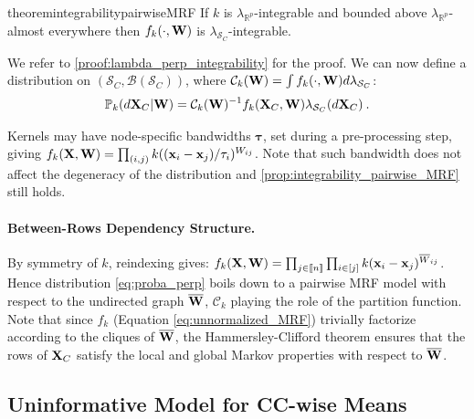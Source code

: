 \begin{restatable}{theorem}{integrabilitypairwiseMRF}
\label{prop:integrability_pairwise_MRF}
If $k$ is $\lambda_{\mathbb{R}^p}$-integrable and bounded above $\lambda_{\mathbb{R}^p}$-almost everywhere then $f_{k}(\cdot, \mathbf{W})$ is $\lambda_{\mathcal{S}_{C}}$-integrable.
\end{restatable}

We refer to \cref{proof:lambda_perp_integrability} for the proof.
We can now define a distribution on $(\mathcal{S}_{C}, \mathcal{B}(\mathcal{S}_{C}))$, where $\mathcal{C}_{k}(\mathbf{W}) = \int f_{k}(\cdot, \mathbf{W}) d\lambda_{\mathcal{S}_{C}}$:
\begin{align}\label{eq:proba_perp}
\mathbb{P}_{k}(d\mathbf{X}_{C} | \mathbf{W}) = \mathcal{C}_{k}(\mathbf{W})^{-1} f_{k}(\mathbf{X}_{C}, \mathbf{W}) \lambda_{\mathcal{S}_{C}}(d\mathbf{X}_{C}) \: .
\end{align}

\begin{remark}
Kernels may have node-specific bandwidths $\bm{\tau}$, set during a pre-processing step, giving $f_{k}(\mathbf{X},\mathbf{W}) = \prod_{(i,j)} k((\mathbf{x}_{i} - \mathbf{x}_{j})/\tau_{i})^{W_{ij}}$. Note that such bandwidth does not affect the degeneracy of the distribution and \cref{prop:integrability_pairwise_MRF} still holds.
\end{remark}


\paragraph{Between-Rows Dependency Structure.} By symmetry of $k$, reindexing gives: $f_{k}(\mathbf{X}, \mathbf{W}) = \prod_{j \in {[\![n]\!]}} \prod_{i \in [j]} k(\mathbf{x}_{i} - \mathbf{x}_{j})^{\overline{W}_{ij}}$. Hence distribution \eqref{eq:proba_perp} boils down to a pairwise MRF model \citep{clifford1990markov} with respect to the undirected graph $\overline{\mathbf{W}}$, $\mathcal{C}_{k}$ playing the role of the partition function. Note that since $f_k$ (Equation \ref{eq:unnormalized_MRF}) trivially factorize according to the cliques of $\overline{\mathbf{W}}$, the Hammersley-Clifford theorem ensures that the rows of $\mathbf{X}_{C}$ satisfy the local and global Markov properties with respect to $\overline{\mathbf{W}}$. 

\subsection{Uninformative Model for CC-wise Means}

